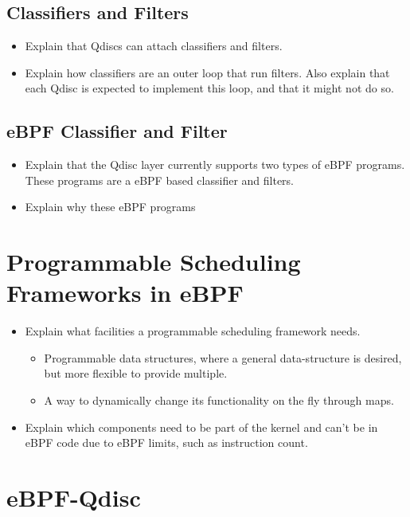 \documentclass[sigconf, nonacm]{acmart}
\begin{document}
\subsection{Classifiers and Filters}

\begin{itemize}
  \item Explain that Qdiscs can attach classifiers and filters.
  \item Explain how classifiers are an outer loop that run filters. Also explain that each Qdisc is expected to implement this loop, and that it might not do so.
\end{itemize}


\subsection{eBPF Classifier and Filter}

\begin{itemize}
  \item Explain that the Qdisc layer currently supports two types of eBPF programs. These programs are a eBPF based classifier and filters.
  \item Explain why these eBPF programs
\end{itemize}


\section{Programmable Scheduling Frameworks in eBPF}

\begin{itemize}
  \item Explain what facilities a programmable scheduling framework needs.
        \begin{itemize}
          \item Programmable data structures, where a general data-structure is desired, but more flexible to provide multiple.
          \item A way to dynamically change its functionality on the fly through maps.
        \end{itemize}
  \item Explain which components need to be part of the kernel and can't be in eBPF code due to eBPF limits, such as instruction count.
\end{itemize}


\section{eBPF-Qdisc}
\end{document}
